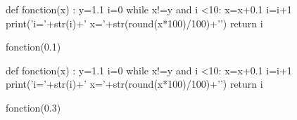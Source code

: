 \exer{}
\setcounter{numques}{0}

\begin{minipage}{0.5\textwidth}
\question{}

\begin{pycode}
def fonction(x) :
    y=1.1
    i=0
    while x!=y and i <10:
        x=x+0.1
        i=i+1
        print('i='+str(i)+' x='+str(round(x*100)/100)+'\n')
    return i

fonction(0.1)
\end{pycode}
\end{minipage}
\begin{minipage}{0.5\textwidth}
\question{}

\begin{pycode}
def fonction(x) :
    y=1.1
    i=0
    while x!=y and i <10:
        x=x+0.1
        i=i+1
        print('i='+str(i)+' x='+str(round(x*100)/100)+'\n')
    return i

fonction(0.3)
\end{pycode}
\end{minipage}




